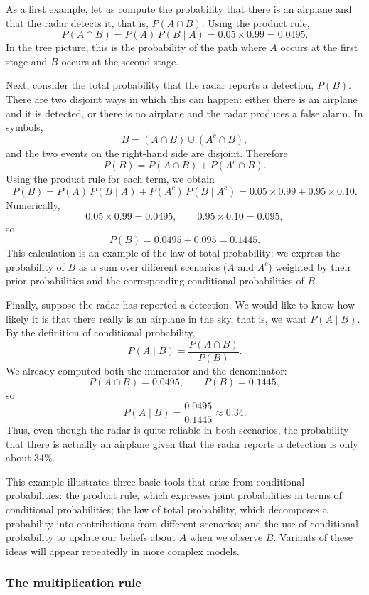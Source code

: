 As a first example, let us compute the probability that there is an airplane and that the radar detects it, that is, \(P(A \cap B)\). Using the product rule,
\[
P(A \cap B) = P(A)\,P(B \mid A) = 0.05 \times 0.99 = 0.0495.
\]
In the tree picture, this is the probability of the path where \(A\) occurs at the first stage and \(B\) occurs at the second stage.

Next, consider the total probability that the radar reports a detection, \(P(B)\). There are two disjoint ways in which this can happen: either there is an airplane and it is detected, or there is no airplane and the radar produces a false alarm. In symbols,
\[
B = (A \cap B) \cup (A^c \cap B),
\]
and the two events on the right-hand side are disjoint. Therefore
\[
P(B) = P(A \cap B) + P(A^c \cap B).
\]
Using the product rule for each term, we obtain
\[
P(B) = P(A)\,P(B \mid A) + P(A^c)\,P(B \mid A^c)
= 0.05 \times 0.99 + 0.95 \times 0.10.
\]
Numerically,
\[
0.05 \times 0.99 = 0.0495, \qquad 0.95 \times 0.10 = 0.095,
\]
so
\[
P(B) = 0.0495 + 0.095 = 0.1445.
\]
This calculation is an example of the law of total probability: we express the probability of \(B\) as a sum over different scenarios (\(A\) and \(A^c\)) weighted by their prior probabilities and the corresponding conditional probabilities of \(B\).

Finally, suppose the radar has reported a detection. We would like to know how likely it is that there really is an airplane in the sky, that is, we want \(P(A \mid B)\). By the definition of conditional probability,
\[
P(A \mid B) = \frac{P(A \cap B)}{P(B)}.
\]
We already computed both the numerator and the denominator:
\[
P(A \cap B) = 0.0495, \qquad P(B) = 0.1445,
\]
so
\[
P(A \mid B) = \frac{0.0495}{0.1445} \approx 0.34.
\]
Thus, even though the radar is quite reliable in both scenarios, the probability that there is actually an airplane given that the radar reports a detection is only about \(34\%\).

This example illustrates three basic tools that arise from conditional probabilities: the product rule, which expresses joint probabilities in terms of conditional probabilities; the law of total probability, which decomposes a probability into contributions from different scenarios; and the use of conditional probability to update our beliefs about \(A\) when we observe \(B\). Variants of these ideas will appear repeatedly in more complex models.


\subsubsection{The multiplication rule}

